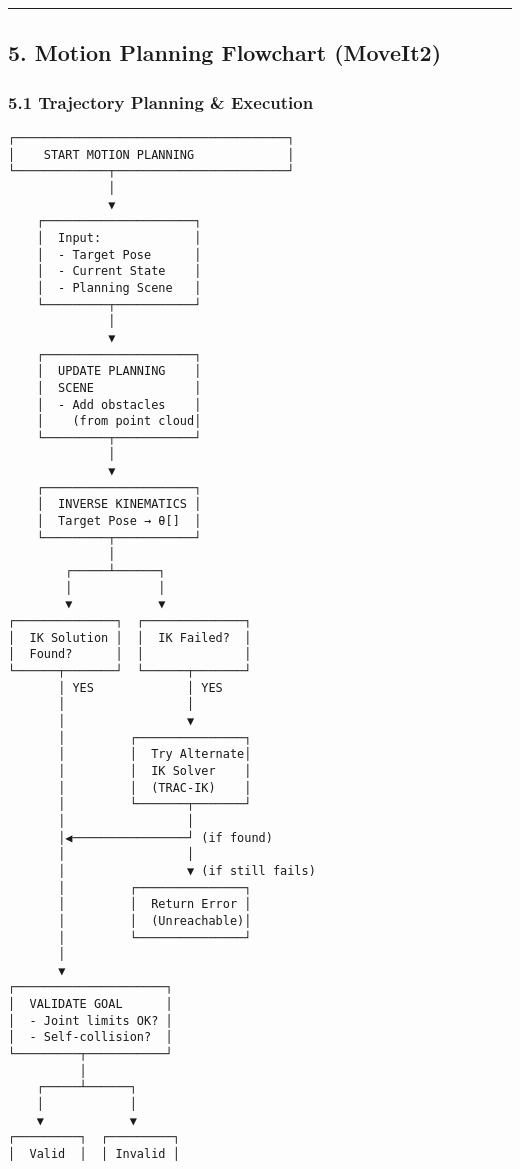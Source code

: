 \documentclass[
]{article}
\begin{document}
\begin{center}\rule{0.5\linewidth}{0.5pt}\end{center}

\hypertarget{motion-planning-flowchart-moveit2}{%
\subsection{5. Motion Planning Flowchart
(MoveIt2)}\label{motion-planning-flowchart-moveit2}}

\hypertarget{trajectory-planning-execution}{%
\subsubsection{5.1 Trajectory Planning \&
Execution}\label{trajectory-planning-execution}}

\begin{verbatim}
┌──────────────────────────────────────┐
│    START MOTION PLANNING             │
└─────────────┬────────────────────────┘
              │
              ▼
    ┌─────────────────────┐
    │  Input:             │
    │  - Target Pose      │
    │  - Current State    │
    │  - Planning Scene   │
    └─────────┬───────────┘
              │
              ▼
    ┌─────────────────────┐
    │  UPDATE PLANNING    │
    │  SCENE              │
    │  - Add obstacles    │
    │    (from point cloud│
    └─────────┬───────────┘
              │
              ▼
    ┌─────────────────────┐
    │  INVERSE KINEMATICS │
    │  Target Pose → θ[]  │
    └─────────┬───────────┘
              │
        ┌─────┴──────┐
        │            │
        ▼            ▼
┌──────────────┐  ┌──────────────┐
│  IK Solution │  │  IK Failed?  │
│  Found?      │  │              │
└──────┬───────┘  └──────┬───────┘
       │ YES             │ YES
       │                 │
       │                 ▼
       │         ┌───────────────┐
       │         │  Try Alternate│
       │         │  IK Solver    │
       │         │  (TRAC-IK)    │
       │         └───────┬───────┘
       │                 │
       │◀────────────────┘ (if found)
       │                 │
       │                 ▼ (if still fails)
       │         ┌───────────────┐
       │         │  Return Error │
       │         │  (Unreachable)│
       │         └───────────────┘
       │
       ▼
┌─────────────────────┐
│  VALIDATE GOAL      │
│  - Joint limits OK? │
│  - Self-collision?  │
└─────────┬───────────┘
          │
    ┌─────┴──────┐
    │            │
    ▼            ▼
┌─────────┐  ┌─────────┐
│  Valid  │  │ Invalid │

\end{verbatim}
\end{document}
